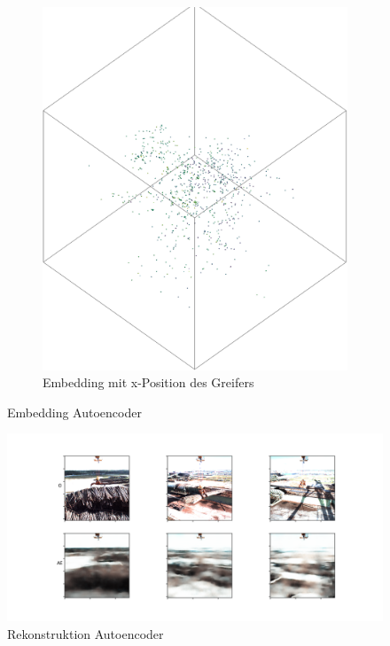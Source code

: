 \begin{figure}[h]
\begin{subfigure}[c]{0.49\textwidth}
			\includegraphics[width=1\textwidth, center]{bilder/Hauptteil/Autoencoder_Grappel_Detection/x_embKopie.png}
			\caption{Embedding mit x-Position des Greifers}
			\label{img:Emb_x_AE}	
		\end{subfigure}
		\caption{Embedding Autoencoder}
		\label{img:EmbeddingAE_V}
	\end{figure}
	
	\begin{figure}[h]
		\centering
		\includegraphics[width=1\textwidth, center]{bilder/Hauptteil/Autoencoder_Grappel_Detection/OriginalPicturesAndReconstruction.png}
		\caption{Rekonstruktion Autoencoder}
		\label{img:RekonstruktionAE}
	\end{figure}  
	
